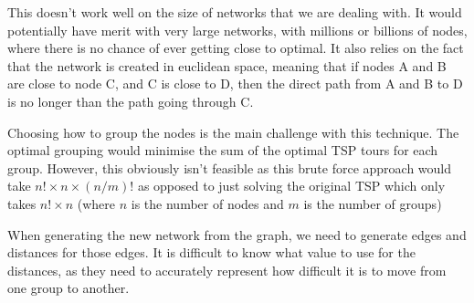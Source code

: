 \documentclass[a4paper, 11pt,table]{article}
\begin{document}
	This doesn't work well on the size of networks that we are dealing with. It would potentially have merit with very large networks, with millions or billions of nodes, where there is no chance of ever getting close to optimal. It also relies on the fact that the network is created in euclidean space, meaning that if nodes A and B are close to node C, and C is close to D, then the direct path from A and B to D is no longer than the path going through C.
	
	Choosing how to group the nodes is the main challenge with this technique. The optimal grouping would minimise the sum of the optimal TSP tours for each group. However, this obviously isn't feasible as this brute force approach would take $n! \times n \times (n/m)!$ as opposed to just solving the original TSP which only takes $n! \times n$ (where $n$ is the number of nodes and $m$ is the number of groups)
	
	When generating the new network from the graph, we need to generate edges and distances for those edges. It is difficult to know what value to use for the distances, as they need to accurately represent how difficult it is to move from one group to another.
\end{document}
